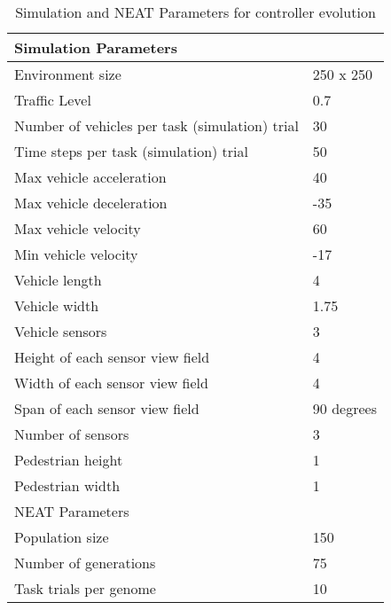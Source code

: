 \begin{table}[h!]
\centering
\caption{Simulation and NEAT Parameters for controller evolution}
\label{my-label}
\begin{tabular}{@{}ll@{}}
\toprule
\multicolumn{2}{l}{Simulation Parameters}                         \\ \midrule
Environment size                               & 250 x 250        \\
Traffic Level                                  & 0.7              \\
Number of vehicles per task (simulation) trial & 30               \\
Time steps per task (simulation) trial         & 50               \\
Max vehicle acceleration                       & 40               \\
Max vehicle deceleration                       & -35              \\
Max vehicle velocity                           & 60               \\
Min vehicle velocity                           & -17              \\
Vehicle length                                 & 4                \\
Vehicle width                                  & 1.75             \\
Vehicle sensors                                & 3                \\
Height of each sensor view field	           & 4                \\
Width of each sensor view field                & 4                \\
Span of each sensor view field                 & 90 degrees       \\
Number of sensors							   & 3			      \\
Pedestrian height                              & 1                \\
Pedestrian width                               & 1                \\ \midrule
\multicolumn{2}{l}{NEAT Parameters}                               \\ \midrule
Population size                                & 150              \\
Number of generations                          & 75               \\
Task trials per genome                         & 10               \\

\end{tabular}
\end{table}
